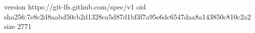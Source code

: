 version https://git-lfs.github.com/spec/v1
oid sha256:7e8c2d8aabd50cb2d1328ca5d87d1bf3f7a95e6dc6547daa8a143850c810c2a2
size 2771
